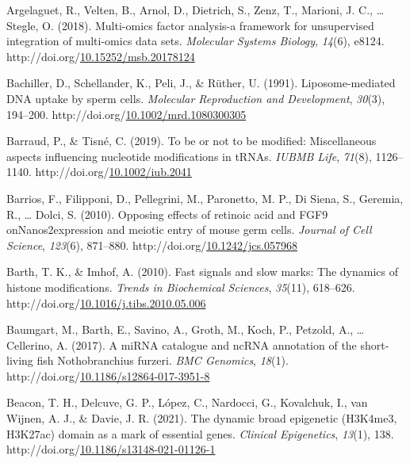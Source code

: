 \documentclass[12pt,twoside]{reedthesis}
\newlength{\cslhangindent}
\newenvironment{CSLReferences}[2] %
 {%
  \setlength{\parindent}{0pt}
  \ifodd #1 \everypar{\setlength{\hangindent}{\cslhangindent}}\ignorespaces\fi
  \ifnum #2 > 0
  \setlength{\parskip}{#2\baselineskip}
  \fi
 }%
 {}
\begin{document}
\begin{CSLReferences}{1}{0}
\leavevmode{}%
Argelaguet, R., Velten, B., Arnol, D., Dietrich, S., Zenz, T., Marioni, J. C., \ldots{} Stegle, O. (2018). Multi-omics factor analysis-a framework for unsupervised integration of multi-omics data sets. \emph{Molecular Systems Biology}, \emph{14}(6), e8124. http://doi.org/\href{https://doi.org/10.15252/msb.20178124}{10.15252/msb.20178124}

\leavevmode{}%
Bachiller, D., Schellander, K., Peli, J., \& Rüther, U. (1991). Liposome-mediated {DNA} uptake by sperm cells. \emph{Molecular Reproduction and Development}, \emph{30}(3), 194--200. http://doi.org/\href{https://doi.org/10.1002/mrd.1080300305}{10.1002/mrd.1080300305}

\leavevmode{}%
Barraud, P., \& Tisné, C. (2019). To be or not to be modified: Miscellaneous aspects influencing nucleotide modifications in tRNAs. \emph{IUBMB Life}, \emph{71}(8), 1126--1140. http://doi.org/\href{https://doi.org/10.1002/iub.2041}{10.1002/iub.2041}

\leavevmode{}%
Barrios, F., Filipponi, D., Pellegrini, M., Paronetto, M. P., Di Siena, S., Geremia, R., \ldots{} Dolci, S. (2010). Opposing effects of retinoic acid and FGF9 onNanos2expression and meiotic entry of mouse germ cells. \emph{Journal of Cell Science}, \emph{123}(6), 871--880. http://doi.org/\href{https://doi.org/10.1242/jcs.057968}{10.1242/jcs.057968}

\leavevmode{}%
Barth, T. K., \& Imhof, A. (2010). Fast signals and slow marks: The dynamics of histone modifications. \emph{Trends in Biochemical Sciences}, \emph{35}(11), 618--626. http://doi.org/\href{https://doi.org/10.1016/j.tibs.2010.05.006}{10.1016/j.tibs.2010.05.006}

\leavevmode{}%
Baumgart, M., Barth, E., Savino, A., Groth, M., Koch, P., Petzold, A., \ldots{} Cellerino, A. (2017). A miRNA catalogue and ncRNA annotation of the short-living fish Nothobranchius furzeri. \emph{BMC Genomics}, \emph{18}(1). http://doi.org/\href{https://doi.org/10.1186/s12864-017-3951-8}{10.1186/s12864-017-3951-8}

\leavevmode{}%
Beacon, T. H., Delcuve, G. P., López, C., Nardocci, G., Kovalchuk, I., van Wijnen, A. J., \& Davie, J. R. (2021). The dynamic broad epigenetic (H3K4me3, H3K27ac) domain as a mark of essential genes. \emph{Clinical Epigenetics}, \emph{13}(1), 138. http://doi.org/\href{https://doi.org/10.1186/s13148-021-01126-1}{10.1186/s13148-021-01126-1}


\end{CSLReferences}
\end{document}

